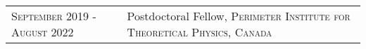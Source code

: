 \vspace*{-1.6cm}
\begin{longtable}{R{2.5cm}|p{14.8cm}}
 	\textsc{September 2019 - August 2022} & Postdoctoral Fellow, \textsc{Perimeter Institute for Theoretical Physics, Canada} \\
\end{longtable}
